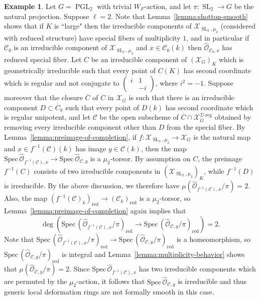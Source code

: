 \documentclass[11pt,reqno]{amsart}
\theoremstyle{definition}
\newtheorem{example}[theorem]{Example}
\renewcommand{\rm}{\mathrm}
\newcommand{\Spec}{\mathrm{Spec} \,}
\newcommand{\cO}{\mathcal{O}}
\newcommand{\sC}{{\mathscr C}}
\newcommand{\sX}{{\mathscr X}}
\DeclareMathOperator{\PGL}{PGL}
\DeclareMathOperator{\SL}{SL}
\newcommand{\ov}[1]{\overline{#1}}
\begin{document}
\begin{example}\label{example:universal-deformation-ring}
	Let $G = \PGL_2$ with trivial $W_F$-action, and let $\pi\colon \SL_2 \to G$ be the natural projection. Suppose $\ell = 2$. Note that Lemma~\ref{lemma:shotton-smooth} shows that if $K$ is ``large" then the irreducible components of $\sX_{\SL_2, \mu_2}$ (considered with reduced structure) have special fibers of multiplicity $1$, and in particular if $\sC_0$ is an irreducible component of $\sX_{\SL_2,\mu_2}$ and $x \in \sC_0(k)$ then $\widehat{\cO}_{\sC_0,x}$ has reduced special fiber. Let $C$ be an irreducible component of $(\sX_G)_K$ which is geometrically irreducible such that every point of $C(K)$ has second coordinate which is regular and not conjugate to $\begin{pmatrix} i&1\\&-i \end{pmatrix}$, where $i^2 = -1$. Suppose moreover that the closure $\ov{C}$ of $C$ in $\sX_G$ is such that there is an irreducible component $D \subset \ov{C}_k$ such that every point of $D(k)$ has second coordinate which is regular unipotent, and let $\sC$ be the open subscheme of $\ov{C} \cap \sX_G^{\Sigma\textrm{-reg}}$ obtained by removing every irreducible component other than $D$ from the special fiber. By Lemma~\ref{lemma:preimage-of-completion}, if $f\colon \sX_{\SL_2,\mu_2} \to \sX_G$ is the natural map and $x \in f^{-1}(\sC)(k)$ has image $y \in \sC(k)$, then the map $\Spec \widehat{\cO}_{f^{-1}(\sC),x} \to \Spec \widehat{\cO}_{\sC,y}$ is a $\mu_2$-torsor. By assumption on $C$, the preimage $f^{-1}(C)$ consists of two irreducible components in $(\sX_{\SL_2,\mu_2})_K$, while $f^{-1}(D)$ is irreducible. By the above discussion, we therefore have $\mu(\widehat{\cO}_{f^{-1}(\sC),x}/\pi) = 2$. Also, the map $(f^{-1}(\sC)_k)_{\rm{red}} \to (\sC_k)_{\rm{red}}$ is a $\mu_2$-torsor, so Lemma~\ref{lemma:preimage-of-completion} again implies that
	\[
	\deg(\Spec (\widehat{\cO}_{f^{-1}(\sC),x}/\pi)_{\rm{red}} \to \Spec (\widehat{\cO}_{\sC,y}/\pi)_{\rm{red}}) = 2.
	\]
	Note that $\Spec (\widehat{\cO}_{f^{-1}(\sC),x}/\pi)_{\rm{red}} \to \Spec (\widehat{\cO}_{\sC,y}/\pi)_{\rm{red}}$ is a homeomorphism, so $\Spec (\widehat{\cO}_{\sC,y}/\pi)_{\rm{red}}$ is integral and Lemma~\ref{lemma:multiplicity-behavior} shows that $\mu(\widehat{\cO}_{\sC,y}/\pi) = 2$. Since $\Spec \widehat{\cO}_{f^{-1}(\sC), x}$ has two irreducible components which are permuted by the $\mu_2$-action, it follows that $\Spec \widehat{\cO}_{\sC,y}$ is irreducible and thus generic local deformation rings are not formally smooth in this case.
\end{example}
\end{document}
